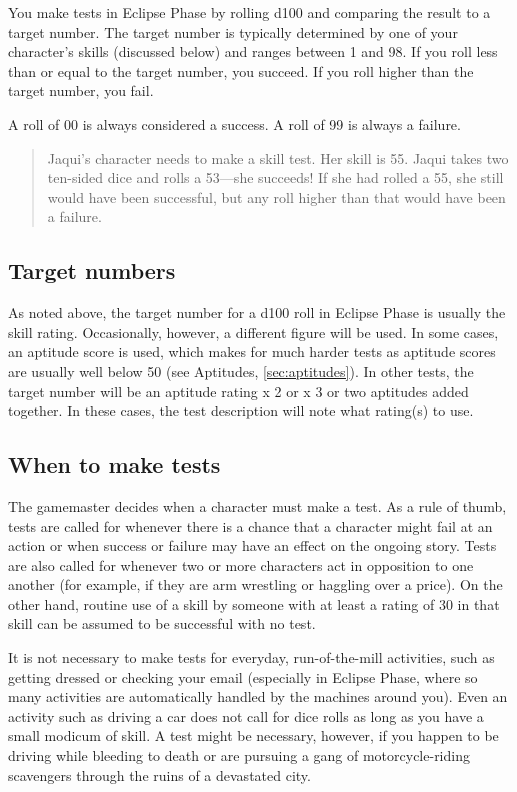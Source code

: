 You make tests in Eclipse Phase by rolling d100 and comparing the result to a target number. The target number is typically determined by one of your character's skills (discussed below) and ranges between 1 and 98. If you roll less than or equal to the target number, you succeed. If you roll higher than the target number, you fail.

A roll of 00 is always considered a success. A roll of 99 is always a failure.

\begin{quotation}
Jaqui's character needs to make a skill test. Her skill is 55. Jaqui takes two ten-sided dice and rolls a 53—she succeeds! If she had rolled a 55, she still would have been successful, but any roll higher than that would have been a failure.
\end{quotation}

\subsection{Target numbers}
\label{sec:target-numbers}

As noted above, the target number for a d100 roll in Eclipse Phase is usually the skill rating. Occasionally, however, a different figure will be used. In some cases, an aptitude score is used, which makes for much harder tests as aptitude scores are usually well below 50 (see Aptitudes, \ref{sec:aptitudes}). In other tests, the target number will be an aptitude rating x 2 or x 3 or two aptitudes added together. In these cases, the test description will note what rating(s) to use.

\subsection{When to make tests}
\label{sec:when-make-tests}

The gamemaster decides when a character must make a test. As a rule of thumb, tests are called for whenever there is a chance that a character might fail at an action or when success or failure may have an effect on the ongoing story. Tests are also called for whenever two or more characters act in opposition to one another (for example, if they are arm wrestling or haggling over a price). On the other hand, routine use of a skill by someone with at least a rating of 30 in that skill can be assumed to be successful with no test.

It is not necessary to make tests for everyday, run-of-the-mill activities, such as getting dressed or checking your email (especially in Eclipse Phase, where so many activities are automatically handled by the machines around you). Even an activity such as driving a car does not call for dice rolls as long as you have a small modicum of skill. A test might be necessary, however, if you happen to be driving while bleeding to death or are pursuing a gang of motorcycle-riding scavengers through the ruins of a devastated city.

